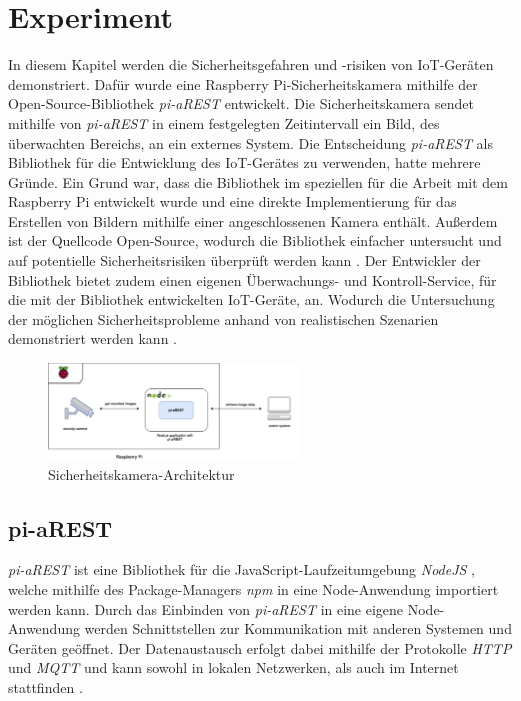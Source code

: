 \section{Experiment}
In diesem Kapitel werden die Sicherheitsgefahren und -risiken von IoT-Geräten
demonstriert.  Dafür wurde eine Raspberry Pi-Sicherheitskamera mithilfe der
Open-Source-Bibliothek \textit{pi-aREST} \cite{piarestgtihub, piarestnpm}
entwickelt. Die Sicherheitskamera sendet mithilfe von \textit{pi-aREST} in
einem festgelegten Zeitintervall ein Bild, des überwachten Bereichs, an ein
externes System. Die Entscheidung \textit{pi-aREST} als Bibliothek für die
Entwicklung des IoT-Gerätes zu verwenden, hatte mehrere Gründe.  Ein Grund war,
dass die Bibliothek im speziellen für die Arbeit mit dem Raspberry Pi
entwickelt wurde und eine direkte Implementierung für das Erstellen von Bildern
mithilfe einer angeschlossenen Kamera enthält. Außerdem ist der Quellcode
Open-Source, wodurch die Bibliothek einfacher untersucht und auf potentielle
Sicherheitsrisiken überprüft werden kann \cite{piarestgtihub}. Der Entwickler
der Bibliothek bietet zudem einen eigenen Überwachungs- und Kontroll-Service,
für die mit der Bibliothek entwickelten IoT-Geräte, an. Wodurch die
Untersuchung der möglichen Sicherheitsprobleme anhand von realistischen
Szenarien demonstriert werden kann \cite{arestservice}.

\begin{figure}[t]
  \centerline{\includegraphics[width=250px]{images/raspberry_architecture}}
  \caption{Sicherheitskamera-Architektur}
  \label{fig:arch-raspberrypi}
\end{figure}

\subsection{pi-aREST}
\textit{pi-aREST} ist eine Bibliothek für die JavaScript-Laufzeitumgebung
\textit{NodeJS} \cite{node}, welche mithilfe des Package-Managers \textit{npm}
\cite{piarestnpm} in eine Node-Anwendung importiert werden kann. Durch das
Einbinden von \textit{pi-aREST} in eine eigene Node-Anwendung werden
Schnittstellen zur Kommunikation mit anderen Systemen und Geräten geöffnet. Der
Datenaustausch erfolgt dabei mithilfe der Protokolle \textit{HTTP} und
\textit{MQTT} und kann sowohl in lokalen Netzwerken, als auch im Internet
stattfinden \cite{piarestgtihub}.

